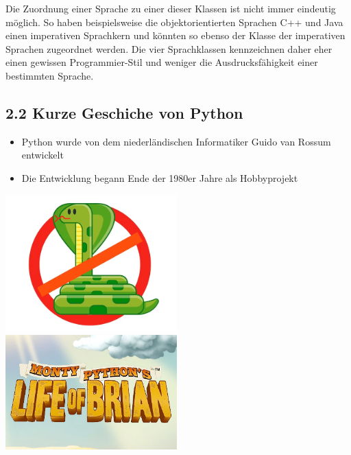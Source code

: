 \documentclass[
  11pt,
  a4paper,
  DIV=11,
  numbers=noendperiod]{scrartcl}
\providecommand{\tightlist}{%
  \setlength{\itemsep}{0pt}\setlength{\parskip}{0pt}}\usepackage{longtable,booktabs,array}
\begin{document}
Die Zuordnung einer Sprache zu einer dieser Klassen ist nicht immer
eindeutig möglich. So haben beispielsweise die objektorientierten
Sprachen C++ und Java einen imperativen Sprachkern und könnten so ebenso
der Klasse der imperativen Sprachen zugeordnet werden. Die vier
Sprachklassen kennzeichnen daher eher einen gewissen Programmier-Stil
und weniger die Ausdrucksfähigkeit einer bestimmten Sprache.

\subsection{2.2 Kurze Geschiche von
Python}\label{kurze-geschiche-von-python}

\begin{itemize}
\tightlist
\item
  Python wurde von dem niederländischen Informatiker Guido van Rossum
  entwickelt
\item
  Die Entwicklung begann Ende der 1980er Jahre als Hobbyprojekt
\end{itemize}

\includegraphics[width=2.60417in,height=\textheight,keepaspectratio]{images/nosnake.jpg}
\includegraphics[width=2.60417in,height=\textheight,keepaspectratio]{images/montypython.jpg}
\end{document}
